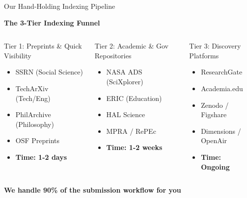 \documentclass[10pt, aspectratio=169]{beamer}
\begin{document}
	
	
	
	\begin{frame}{Our Hand-Holding Indexing Pipeline}
		\begin{center}
			\textbf{The 3-Tier Indexing Funnel}
		\end{center}
		
		\begin{columns}[T]
			\begin{block}{\textcolor{myblue}{Tier 1: Preprints \& Quick Visibility}}
				\tiny
				\begin{itemize}
					\item SSRN (Social Science)
					\item TechArXiv (Tech/Eng)
					\item PhilArchive (Philosophy)
					\item OSF Preprints
					\item \textbf{Time: 1-2 days}
				\end{itemize}
			\end{block}
			
			\begin{block}{\textcolor{myblue}{Tier 2: Academic \& Gov Repositories}}
				\tiny
				\begin{itemize}
					\item NASA ADS (SciXplorer)
					\item ERIC (Education)
					\item HAL Science
					\item MPRA / RePEc
					\item \textbf{Time: 1-2 weeks}
				\end{itemize}
			\end{block}
			
			\begin{block}{\textcolor{myblue}{Tier 3: Discovery Platforms}}
				\tiny
				\begin{itemize}
					\item ResearchGate
					\item Academia.edu
					\item Zenodo / Figshare
					\item Dimensions / OpenAir
					\item \textbf{Time: Ongoing}
				\end{itemize}
			\end{block}
		\end{columns}
		
		\vspace{0.3cm}
		\begin{center}
			\textbf{We handle 90\% of the submission workflow for you}
		\end{center}
	\end{frame}
	
\end{document}
